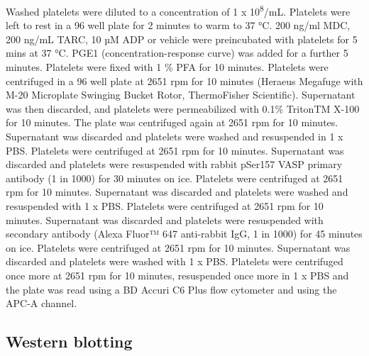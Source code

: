 \documentclass[11pt,twoside]{bristolthesis}
\begin{document}
Washed platelets were diluted to a concentration of 1 x 10\textsuperscript{8}/mL. Platelets were left to rest in a 96 well plate for 2 minutes to warm to 37 °C. 200 ng/ml MDC, 200 ng/mL TARC, 10 µM ADP or vehicle were preincubated with platelets for 5 mins at 37 °C. PGE1 (concentration-response curve) was added for a further 5 minutes. Platelets were fixed with 1 \% PFA for 10 minutes. Platelets were centrifuged in a 96 well plate at 2651 rpm for 10 minutes (Heraeus Megafuge with M-20 Microplate Swinging Bucket Rotor, ThermoFisher Scientific). Supernatant was then discarded, and platelets were permeabilized with 0.1\% TritonTM X-100 for 10 minutes. The plate was centrifuged again at 2651 rpm for 10 minutes. Supernatant was discarded and platelets were washed and resuspended in 1 x PBS. Platelets were centrifuged at 2651 rpm for 10 minutes. Supernatant was discarded and platelets were resuspended with rabbit pSer157 VASP primary antibody (1 in 1000) for 30 minutes on ice. Platelets were centrifuged at 2651 rpm for 10 minutes. Supernatant was discarded and platelets were washed and resuspended with 1 x PBS. Platelets were centrifuged at 2651 rpm for 10 minutes. Supernatant was discarded and platelets were resuspended with secondary antibody (Alexa Fluor™ 647 anti-rabbit IgG, 1 in 1000) for 45 minutes on ice. Platelets were centrifuged at 2651 rpm for 10 minutes. Supernatant was discarded and platelets were washed with 1 x PBS. Platelets were centrifuged once more at 2651 rpm for 10 minutes, resuspended once more in 1 x PBS and the plate was read using a BD Accuri C6 Plus flow cytometer and using the APC-A channel.

\hypertarget{western-blotting}{%
\subsection{Western blotting}\label{western-blotting}}
\end{document}
